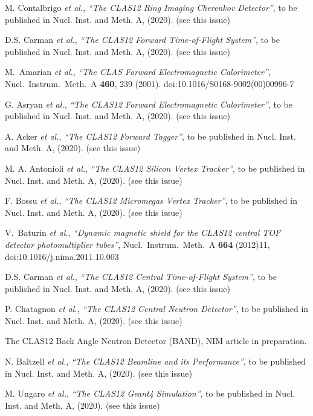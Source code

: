 \documentclass[final,3p,twocolumn]{elsarticle}
\begin{document}
\begin{thebibliography}{99}
M. Contalbrigo {\it et al.}, {\it ``The CLAS12 Ring Imaging Cherenkov Detector''}, to be published in Nucl. Inst.
and Meth. A, (2020). (see this issue)

D.S. Carman {\it et al.}, {\it ``The CLAS12 Forward Time-of-Flight System''}, to be published in Nucl. Inst.
and Meth. A, (2020). (see this issue)

M.~Amarian {\it et al.}, {\it ``The CLAS Forward Electromagnetic Calorimeter''},
  Nucl.\ Instrum.\ Meth.\ A {\bf 460}, 239 (2001).
  doi:10.1016/S0168-9002(00)00996-7

G. Asryan {\it et al.}, {\it ``The CLAS12 Forward Electromagnetic Calorimeter''}, to be published in Nucl. Inst.
and Meth. A, (2020). (see this issue)

A. Acker {\it et al.}, {\it ``The CLAS12 Forward Tagger''}, to be published in Nucl. Inst.
and Meth. A, (2020). (see this issue)

M. A. Antonioli {\it et al.}, {\it ``The CLAS12 Silicon Vertex Tracker''}, to be published in Nucl. Inst.
and Meth. A, (2020). (see this issue)

F. Bossu {\it et al.}, {\it ``The CLAS12 Micromegas Vertex Tracker''}, to be published in Nucl. Inst.
and Meth. A, (2020). (see this issue)

V.~Baturin {\it et al.},
{\it  ``Dynamic magnetic shield for the CLAS12 central TOF detector photomultiplier tubes''},
  Nucl.\ Instrum.\ Meth.\ A {\bf 664} (2012)11, doi:10.1016/j.nima.2011.10.003

D.S. Carman {\it et al.}, {\it ``The CLAS12 Central Time-of-Flight System''}, to be published in Nucl. Inst.
and Meth. A, (2020). (see this issue)

P. Chatagnon {\it et al.}, {\it ``The CLAS12 Central Neutron Detector''}, to be published in Nucl. Inst.
and Meth. A, (2020). (see this issue)

The CLAS12 Back Angle Neutron Detector (BAND), NIM article in preparation. 

N. Baltzell {\it et al.}, {\it ``The CLAS12 Beamline and its Performance''}, to be published in Nucl. Inst.
and Meth. A, (2020). (see this issue)

M. Ungaro {\it et al.}, {\it ``The CLAS12 Geant4 Simulation''}, to be published in Nucl. Inst.
and Meth. A, (2020). (see this issue)


\end{thebibliography}
\end{document}
